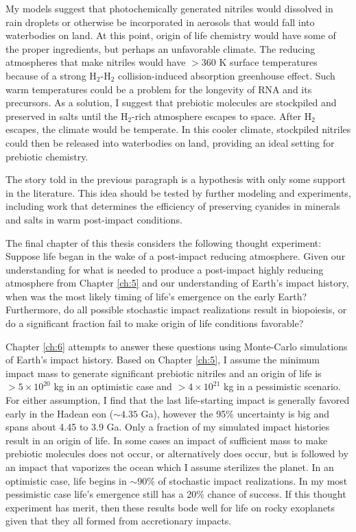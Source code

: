 My models suggest that photochemically generated nitriles would dissolved in rain droplets or otherwise be incorporated in aerosols that would fall into waterbodies on land. 
At this point, origin of life chemistry would have some of the proper ingredients, but perhaps an unfavorable climate. The reducing atmospheres that make nitriles would have $> 360$ K surface temperatures because of a strong H$_2$-H$_2$ collision-induced absorption greenhouse effect. Such warm temperatures could be a problem for the longevity of RNA and its precursors. As a solution, I suggest that prebiotic molecules are stockpiled and preserved in salts until the H$_2$-rich atmosphere escapes to space. After H$_2$ escapes, the climate would be temperate. In this cooler climate, stockpiled nitriles could then be released into waterbodies on land, providing an ideal setting for prebiotic chemistry.

The story told in the previous paragraph is a hypothesis with only some support in the literature. This idea should be tested by further modeling and experiments, including work that determines the efficiency of preserving cyanides in minerals and salts in warm post-impact conditions.

The final chapter of this thesis considers the following thought experiment: Suppose life began in the wake of a post-impact reducing atmosphere. Given our understanding for what is needed to produce a post-impact highly reducing atmosphere from Chapter \ref{ch:5} and our understanding of Earth's impact history, when was the most likely timing of life's emergence on the early Earth? Furthermore, do all possible stochastic impact realizations result in biopoiesis, or do a significant fraction fail to make origin of life conditions favorable? 

Chapter \ref{ch:6} attempts to answer these questions using Monte-Carlo simulations of Earth's impact history. Based on Chapter \ref{ch:5}, I assume the minimum impact mass to generate significant prebiotic nitriles and an origin of life is $> 5 \times 10^{20}$ kg in an optimistic case and $> 4 \times 10^{21}$ kg in a pessimistic scenario. For either assumption, I find that the last life-starting impact is generally favored early in the Hadean eon ($\sim 4.35$ Ga), however the 95\% uncertainty is big and spans about 4.45 to 3.9 Ga. Only a fraction of my simulated impact histories result in an origin of life. In some cases an impact of sufficient mass to make prebiotic molecules does not occur, or alternatively does occur, but is followed by an impact that vaporizes the ocean which I assume sterilizes the planet. In an optimistic case, life begins in $\sim 90\%$ of stochastic impact realizations. In my most pessimistic case life's emergence still has a 20\% chance of success. If this thought experiment has merit, then these results bode well for life on rocky exoplanets given that they all formed from accretionary impacts.
